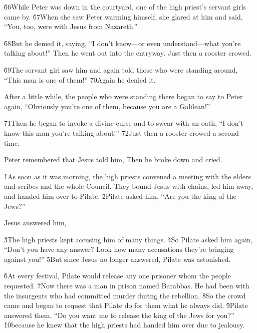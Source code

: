\v{66}While Peter was down in the courtyard, one of the high priest's servant girls came by. \v{67}When she saw Peter warming himself, she glared at him and said, ``You, too, were with Jesus from Nazareth.''

\v{68}But he denied it, saying, ``I don't know---or even understand---what you're talking about!'' Then he went out into the entryway. Just then a rooster crowed.

\v{69}The servant girl saw him and again told those who were standing around, ``This man is one of them!'' \v{70}Again he denied it.

After a little while, the people who were standing there began to say to Peter again, ``Obviously you're one of them, because you are a Galilean!''

\v{71}Then he began to invoke a divine curse and to swear with an oath, ``I don't know this man you're talking about!'' \v{72}Just then a rooster crowed a second time.

Peter remembered that Jesus told him,  Then he broke down and cried.

\v{1}As soon as it was morning, the high priests convened a meeting with the elders and scribes and the whole Council. They bound Jesus with chains, led him away, and handed him over to Pilate. \v{2}Pilate asked him, ``Are you the king of the Jews?''

Jesus answered him, 

\v{3}The high priests kept accusing him of many things. \v{4}So Pilate asked him again, ``Don't you have any answer? Look how many accusations they're bringing against you!'' \v{5}But since Jesus no longer answered, Pilate was astonished.

\v{6}At every festival, Pilate would release any one prisoner whom the people requested. \v{7}Now there was a man in prison named Barabbas. He had been with the insurgents who had committed murder during the rebellion. \v{8}So the crowd came and began to request that Pilate do for them what he always did. \v{9}Pilate answered them, ``Do you want me to release the king of the Jews for you?'' \v{10}because he knew that the high priests had handed him over due to jealousy.

